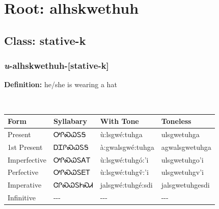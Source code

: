 \needspace{4in}
\section*{Root: alhskwethuh}
\nopagebreak
{}
\needspace{3in}
\subsection*{Class: stative-k}
\nopagebreak
\needspace{2in}
\subsubsection*{\textit{u}{-}\textbf{alhskwethuh}{-}[stative-k]}
\nopagebreak
\textbf{Definition: } he/she is wearing a hat
\\[0.5em]
\begin{tabularx}{\textwidth}{l X X X}%
\toprule%
\textbf{Form}&\textbf{Syllabary}&\textbf{With Tone}&\textbf{Toneless}\\%
\midrule%
Present&ᎤᎵᏍᏇᏚᎦ&ù:lsgwé:tuhga&ulsgwetuhga\\%
1st Present&ᎠᏆᎵᏍᏇᏚᎦ&à:gwalsgwé:tuhga&agwalsgwetuhga\\%
Imperfective&ᎤᎵᏍᏇᏚᎪᎢ&ù:lsgwé:tuhgó:’i&ulsgwetuhgo’i\\%
Perfective&ᎤᎵᏍᏇᏚᎬᎢ&ù:lsgwé:tuhgv̌:’i&ulsgwetuhgv’i\\%
Imperative&ᏣᎵᏍᏇᏚᎨᏍᏗ&jalsgwé:tuhgé:sdi&jalsgwetuhgesdi\\%
Infinitive&{-}{-}{-}&{-}{-}{-}&{-}{-}{-}\\%
\bottomrule%
\end{tabularx}
\\[1em]